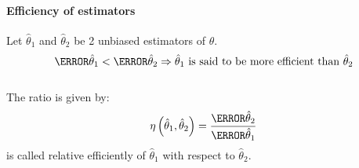 \paragraph{Efficiency of estimators}
Let $\hat{\theta}_{1}$ and $\hat{\theta}_{2}$ be 2 unbiased estimators
of $\theta$.\\
$$\V{\hat{\theta}_{1}} < \V{\hat{\theta}_{2}} \Rightarrow 
\hat{\theta}_{1}\text{ is said to be more efficient than }\hat{\theta}_{2}$$ \\
The ratio is given by:
$$ \eta\left(\hat{\theta}_{1},\hat{\theta}_{2}\right)=\dfrac{\V{\hat{\theta}_{2}}}{\V{\hat{\theta}_{1}}}$$
is called relative efficiently of $\hat{\theta}_{1}$ with respect to 
$\hat{\theta}_{2}$.
